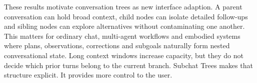 These results motivate conversation trees as new interface adaption. A parent conversation can hold broad context, child nodes can isolate detailed follow-ups and sibling nodes can explore alternatives without contaminating one another. This matters for ordinary chat, multi-agent workflows and embodied systems where plans, observations, corrections and subgoals naturally form nested conversational state. Long context windows increase capacity, but they do not decide which prior turns belong to the current branch. Subchat Trees makes that structure explicit.
It provides more control to the user.
